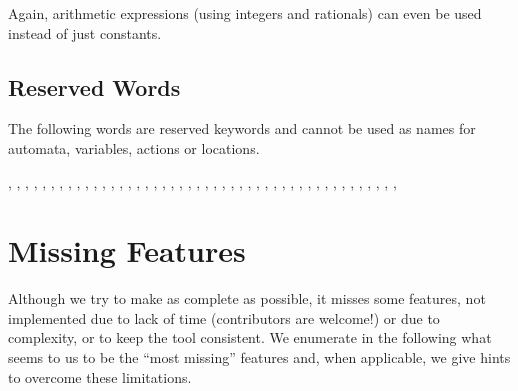 Again, arithmetic expressions (using integers and rationals) can even be used instead of just constants.



\section{Reserved Words}

The following words are reserved keywords and cannot be used as names for automata, variables, actions or locations. 

,
,
,
,
,
,
,
,
,
,
,
,
,
,
,
,
,
,
,
,
,
,
,
,
,
,
,
,
,
,
,
,
,
,
,
,
,
,
,
,
,
,
,
,
,
,






\chapter{Missing Features}

Although we try to make \imitator{} as complete as possible, it misses some features, not implemented due to lack of time (contributors are welcome!) or due to complexity, or to keep the tool consistent.
We enumerate in the following what seems to us to be the ``most missing'' features and, when applicable, we give hints to overcome these limitations.


